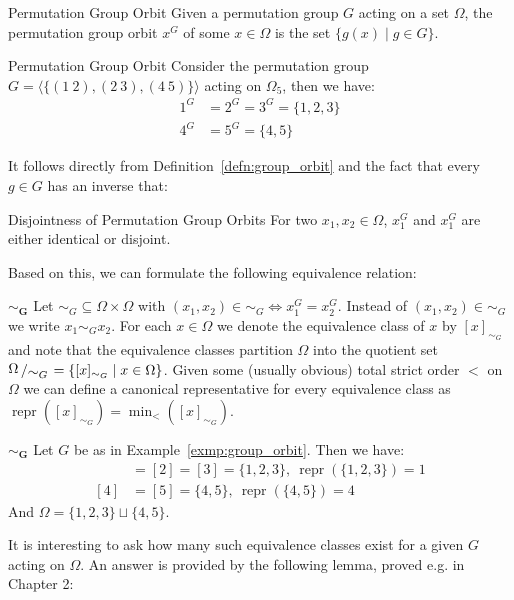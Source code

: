 \begin{defn}[label=defn:group_orbit]{Permutation Group Orbit}
  Given a permutation group $G$ acting on a set $\Omega$, the permutation group
  orbit $x^G$ of some $x \in \Omega$ is the set $\{g(x) \mid g \in G\}$.
\end{defn}

\begin{exmp}[label=exmp:group_orbit]{Permutation Group Orbit}
  Consider the permutation group $G = \langle \{(1\ 2), (2\ 3), (4\ 5)\} \rangle$
  acting on $\Omega_5$, then we have:
  \begin{align*}
    1^G &= 2^G = 3^G = \{1,2,3\} \\
    4^G &= 5^G = \{4,5\}
  \end{align*}
\end{exmp}
%
It follows directly from Definition~\ref{defn:group_orbit} and the fact that
every $g \in G$ has an inverse that:

\begin{lemma}{Disjointness of Permutation Group Orbits}
  For two $x_1, x_2 \in \Omega$, $x_1^G$ and $x_1^G$ are either identical or
  disjoint.
\end{lemma}
%
Based on this, we can formulate the following equivalence relation:

\begin{defn}[label=defn:sim]{$\bm{\sim_G}$}
  Let $\sim_G \subseteq \Omega \times \Omega$ with $(x_1, x_2) \in \sim_G \Leftrightarrow
  x_1^G = x_2^G$. Instead of $(x_1, x_2) \in \sim_G$ we write $x_1 \sim_G x_2$.
  For each $x \in \Omega$ we denote the equivalence class of $x$ by
  $[x]_{\sim_G}$ and note that the equivalence classes partition $\Omega$ into
  the quotient set $\bigslant{\Omega}{\sim_G} = \{[x]_{\sim_G} \mid x \in
  \Omega\}$. Given some (usually obvious) total strict order $<$ on $\Omega$ we
  can define a canonical representative for every equivalence class as
  $\operatorname{repr}([x]_{\sim_G}) = \min_<([x]_{\sim_G})$.
\end{defn}

\begin{exmp}{$\bm{\sim_G}$}
  Let $G$ be as in Example~\ref{exmp:group_orbit}. Then we have:
  \begin{align*}
    [1] &= [2] = [3] = \{1,2,3\},\ \operatorname{repr}(\{1,2,3\}) = 1 \\
    [4] &= [5] = \{4,5\},\ \operatorname{repr}(\{4,5\}) = 4
  \end{align*}
  And $\Omega = \{1,2,3\} \sqcup \{4,5\}$.
\end{exmp}
%
It is interesting to ask how many such equivalence classes exist for a given
$G$ acting on $\Omega$. An answer is provided by the following lemma, proved
e.g. in~\cite{Rotman} Chapter 2:


